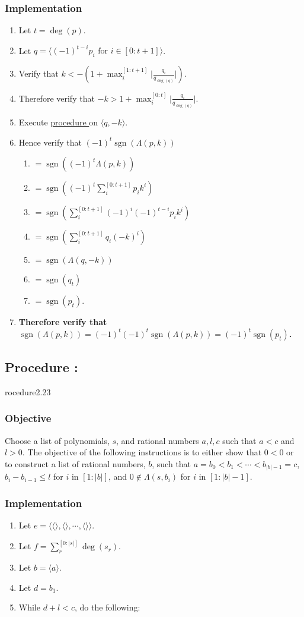 \documentclass{article}
\DeclareMathOperator{\sgn}{sgn}
\newcommand{\for}{\text{ for }}
\newcounter{procedure}[part]
\newcommand{\procedure}[1]{\subsection*{Procedure \thepart:\theprocedure}\label{sec:procedure #1}\global\expandafter\edef\csname procedure#1\endcsname{\thepart:\theprocedure}\addtocounter{procedure}{1}}
\newcommand{\objective}{\subsubsection*{Objective}}
\newcommand{\implementation}{\subsubsection*{Implementation}}
\newcommand{\procedurehr}[1]{\hyperref[sec:procedure #1]{procedure \expandafter\csname procedure#1\endcsname}}
\begin{document}
\begin{multicols}{2}
			\implementation
				\begin{enumerate}
					\item Let $t=\deg(p)$.
					\item Let $q=\langle(-1)^{t-i}p_i\for i\in[0:t+1]\rangle$.
					\item Verify that $k<-(1+\max_i^{[1:t+1]}\lvert\frac{q_i}{q_{\deg(q)}}\rvert)$.
					\item Therefore verify that $-k>1+\max_i^{[0:t]}\lvert\frac{q_i}{q_{\deg(q)}}\rvert$.
					\item Execute \procedurehr{2.21} on $\langle q,-k\rangle$.
					\item Hence verify that $(-1)^t\sgn(\Lambda(p,k))$
					\begin{enumerate}
						\item $=\sgn((-1)^t\Lambda(p,k))$
						\item $=\sgn((-1)^t\sum_i^{[0:{t+1}]} p_ik^i)$
						\item $=\sgn(\sum_i^{[0:{t+1}]} (-1)^i(-1)^{t-i}p_ik^i)$
						\item $=\sgn(\sum_i^{[0:{t+1}]} q_i(-k)^i)$
						\item $=\sgn(\Lambda(q,-k))$
						\item $=\sgn(q_t)$
						\item $=\sgn(p_t)$.
					\end{enumerate}
					\item \textbf{Therefore verify that $\sgn(\Lambda(p,k))=(-1)^t(-1)^t\sgn(\Lambda(p,k))=(-1)^t\sgn(p_t)$.}
				\end{enumerate}
		\procedure{2.23}
			\objective
				Choose a list of polynomials, $s$, and rational numbers $a,l,c$ such that $a<c$ and $l>0$. The objective of the following instructions is to either show that $0<0$ or to construct a list of rational numbers, $b$, such that $a=b_0<b_1<\cdots<b_{\lvert b\rvert-1}=c$, $b_{i}-b_{i-1}\le l$ for $i$ in $[1:\lvert b\rvert]$, and $0\not\in\Lambda(s,b_i)$ for $i$ in $[1:\lvert b\rvert-1]$.
			\implementation
				\begin{enumerate}
					\item Let $e=\langle\langle\rangle,\langle\rangle,\cdots,\langle\rangle\rangle$.
					\item Let $f=\sum_r^{[0:{\lvert s\rvert}]}\deg(s_r)$.
					\item Let $b=\langle a\rangle$.
					\item Let $d=b_1$.
					\item While $d+l<c$, do the following:
					\begin{enumerate}

\end{enumerate}
\end{enumerate}
\end{multicols}
\end{document}
